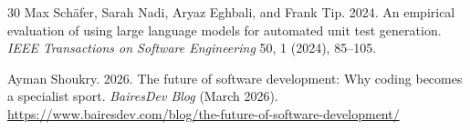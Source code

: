 \documentclass[sigconf,nonacm]{acmart}
\begin{document}
\begin{thebibliography}{30}
Max Sch\"afer, Sarah Nadi, Aryaz Eghbali, and Frank Tip. 2024.
An empirical evaluation of using large language models for automated unit test generation.
\textit{IEEE Transactions on Software Engineering} 50, 1 (2024), 85--105.

Ayman Shoukry. 2026.
The future of software development: Why coding becomes a specialist sport.
\textit{BairesDev Blog} (March 2026).
\url{https://www.bairesdev.com/blog/the-future-of-software-development/}

\end{thebibliography}
\end{document}
